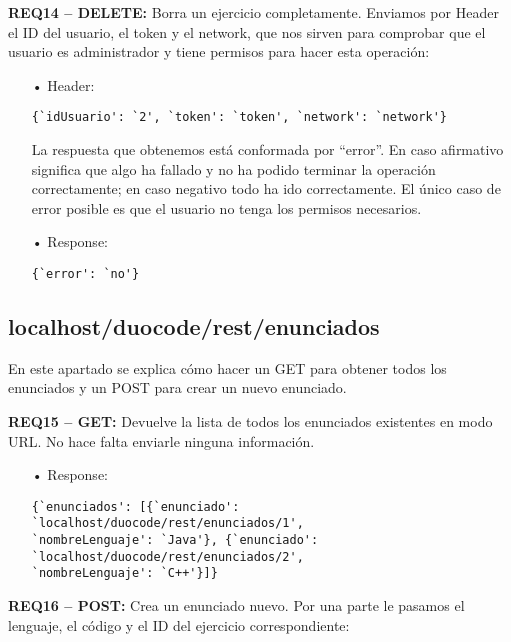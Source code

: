 \textbf{REQ14 – DELETE:} Borra un ejercicio completamente. Enviamos por Header el ID del usuario, el token y el network, que nos sirven para comprobar que el usuario es administrador y tiene permisos para hacer esta operación:

\begin{itemize}
\item[•]
Header: 
{\codesize
\begin{verbatim}
{`idUsuario': `2', `token': `token', `network': `network'}
\end{verbatim}
}

La respuesta que obtenemos está conformada por ``error''. En caso afirmativo significa que algo ha fallado y no ha podido terminar la operación correctamente; en caso negativo todo ha ido correctamente. El único caso de error posible es que el usuario no tenga los permisos necesarios.
\item[•]
Response: 
{\codesize
\begin{verbatim}
{`error': `no'}
\end{verbatim}
}
\end{itemize}

\subsection{localhost/duocode/rest/enunciados}
En este apartado se explica cómo hacer un GET para obtener todos los enunciados y un POST para crear un nuevo enunciado.
\vspace{1em}

\textbf{REQ15 – GET:} Devuelve la lista de todos los enunciados existentes en modo URL. No hace falta enviarle ninguna información.

\begin{itemize}
\item[•]
Response:
{\codesize
\begin{verbatim}
{`enunciados': [{`enunciado': `localhost/duocode/rest/enunciados/1', 
`nombreLenguaje': `Java'}, {`enunciado': `localhost/duocode/rest/enunciados/2', 
`nombreLenguaje': `C++'}]}
\end{verbatim}
}

\end{itemize}

\textbf{REQ16 – POST:} Crea un enunciado nuevo. Por una parte le pasamos el lenguaje, el código y el ID del ejercicio correspondiente:

